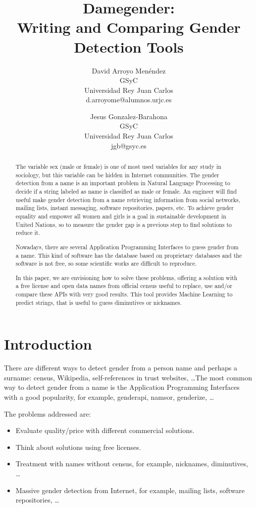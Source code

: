 \documentclass[a4paper]{article}
\title{Damegender: \\ Writing and Comparing Gender Detection Tools}
\author{
David Arroyo Men\'endez \\ GSyC \\ Universidad Rey Juan Carlos \\ d.arroyome@alumnos.urjc.es
\and
Jesus Gonzalez-Barahona \\ GSyC \\ Universidad Rey Juan Carlos \\ jgb@gsyc.es
}
\begin{document}
\maketitle

\begin{abstract}
The variable sex (male or female) is one of most used variables for
any study in sociology, but this variable can be hidden in Internet
communities. The gender detection from a name is an important problem
in Natural Language Processing to decide if a string labeled as name
is classified as male or female. An engineer will find useful
make gender detection from a name retrieving information from social
networks, mailing lists, instant messaging, software repositories,
papers, etc. To achieve gender equality and empower all women and
girls is a goal in sustainable development in United Nations, so to
measure the gender gap is a previous step to find solutions to reduce
it.

Nowadays, there are several Application Programming Interfaces to
guess gender from a name. This kind of software has the database
based on proprietary databases and the software is not free, so some
scientific works are difficult to reproduce.

In this paper, we are envisioning how to solve these problems,
offering a solution with a free license and open data names from
official census useful to replace, use and/or compare these APIs with
very good results. This tool provides Machine Learning to predict
strings, that is useful to guess diminutives or nicknames.
\end{abstract}


\section{Introduction}

There are different ways to detect gender from a person name and
perhaps a surname: census, Wikipedia, self-references in trust
websites, \ldots The most common way to detect gender from a name is the
Application Programming Interfaces with a good popularity, for
example, genderapi, namsor, genderize, \ldots

The problems addressed are:
\begin{itemize}
\item Evaluate quality/price with different commercial solutions.
\item Think about solutions using free licenses.
\item Treatment with names without census, for example, nicknames,
  diminutives, \ldots
\item Massive gender detection from Internet, for example, mailing
  lists, software repositories, \ldots
\end{itemize}
\end{document}
